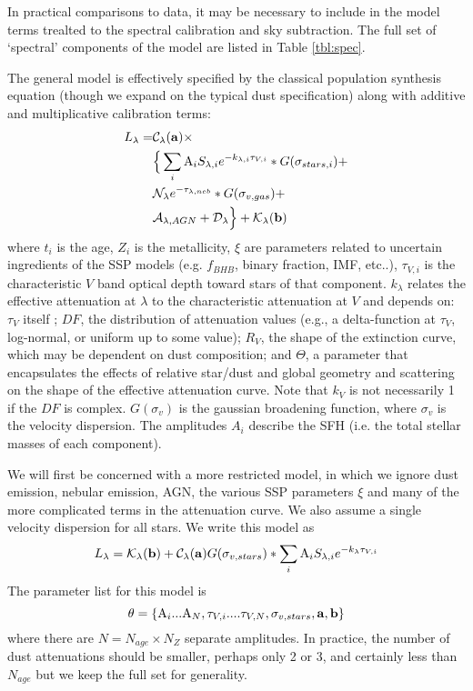 \documentclass{emulateapj}
\begin{document}
In practical comparisons to data, it may be necessary to include in the model terms trealted to the spectral calibration and sky subtraction.  The full set of `spectral' components of the model are listed in Table \ref{tbl:spec}.



The general model is effectively specified by the classical population synthesis equation (though we expand on the typical dust specification) along with additive and multiplicative calibration terms:
\begin{equation}
\begin{split}
L_\lambda  = & \mathcal{C}_\lambda({\bf a}) \times\\
& \Big\{ \sum\limits_i \text{A}_i S_{\lambda,i} e^{-k_{\lambda, i}\tau_{V,i} } \ast G(\sigma_{stars, i}) +\\
& \mathcal{N}_\lambda e^{-\tau_{\lambda,neb}} \ast G(\sigma_{v,gas}) + \\ 
& \mathcal{A}_{\lambda, AGN} + \mathcal{D}_\lambda \Big\} + \mathcal{K}_\lambda({\bf b})
\end{split}
\end{equation}
where $t_i$ is the age, $Z_i$ is the metallicity, $\xi$ are parameters related to uncertain ingredients of the SSP models (e.g. $f_{BHB}$, binary fraction, IMF, etc..), $\tau_{V,i}$ is the characteristic $V$ band optical depth toward stars of that component. $k_\lambda$ relates the effective attenuation at $\lambda$ to the characteristic attenuation at $V$ and depends on: $\tau_V$ itself \citep[e.g.][]{chevallard}; $DF$,  the distribution of attenuation values (e.g., a delta-function at $\tau_V$, log-normal, or uniform up to some value); $R_V$, the shape of the extinction curve, which may be dependent on dust composition; and $\Theta$, a parameter that encapsulates the effects of relative star/dust and global geometry  and scattering on the shape of the effective attenuation curve.  Note that $k_V$ is not necessarily 1 if the $DF$ is complex. $G(\sigma_v)$ is the gaussian broadening function, where $\sigma_v$ is the velocity dispersion. The amplitudes $A_i$ describe the SFH (i.e. the total stellar masses of each component).

We will first be concerned with a more restricted model, in which we ignore dust emission, nebular emission, AGN, the various SSP parameters $\xi$ and many of the more complicated terms in the attenuation curve.  We also assume a single velocity dispersion for all stars. We write this model as 
\begin{equation}
L_\lambda =  \mathcal{K}_\lambda({\bf b}) + \mathcal{C}_\lambda({\bf a})  G(\sigma_{v, stars}) \ast \sum\limits_i \text{A}_i S_{\lambda,i} e^{-k_\lambda\tau_{V,i} } 
\end{equation}
The parameter list for this model is 
\begin{equation}
{\bf \theta} =  \{\text{A}_i...\text{A}_N, \tau_{V,i}....\tau_{V, N}, \sigma_{v, stars}, {\bf a}, {\bf b}\}
\end{equation}
where there are $N= N_{age} \times N_{Z}$ separate amplitudes.  In practice, the number of dust attenuations should be smaller, perhaps only 2 or 3, and certainly less than $N_{age}$ but we keep the full set for generality.
\end{document}
